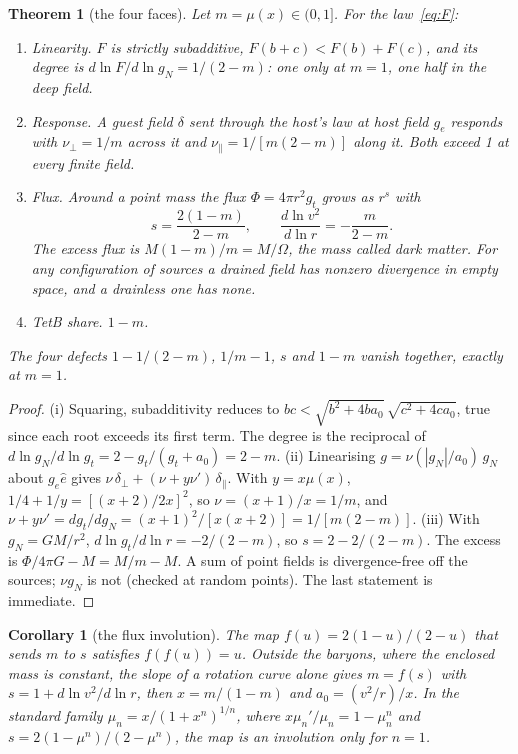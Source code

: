 \documentclass[twocolumn]{iopjournal}
\newtheorem{theorem}{Theorem}
\newtheorem{corollary}{Corollary}
\theoremstyle{definition}
\theoremstyle{remark}
\begin{document}
\begin{theorem}[the four faces]\label{thm:faces}
Let $m = \mu(x) \in (0,1]$. For the law~\eqref{eq:F}:
\begin{enumerate}
\item[(i)] \emph{Linearity.} $F$ is strictly subadditive,
  $F(b + c) < F(b) + F(c)$, and its degree is
  $d\ln F/d\ln g_N = 1/(2 - m)$: one only at $m = 1$, one half in the deep
  field.
\item[(ii)] \emph{Response.} A guest field $\delta$ sent through the
  host's law at host field $g_e$ responds with $\nu_\perp = 1/m$
  across it and $\nu_\parallel = 1/[m(2-m)]$ along it. Both exceed 1 at
  every finite field.
\item[(iii)] \emph{Flux.} Around a point mass the flux
  $\Phi = 4\pi r^2 g_t$ grows as $r^s$ with
  \begin{equation}
    s = \frac{2(1-m)}{2-m}, \qquad
    \frac{d\ln v^2}{d\ln r} = -\frac{m}{2-m}. \label{eq:s}
  \end{equation}
  The excess flux is $M(1-m)/m = M/\Omega$, the mass called dark matter.
  For any configuration of sources a drained field has nonzero divergence
  in empty space, and a drainless one has none.
\item[(iv)] \emph{TetB share.} $1 - m$.
\end{enumerate}
The four defects $1 - 1/(2-m)$, $1/m - 1$, $s$ and $1 - m$ vanish
together, exactly at $m = 1$.
\end{theorem}

\begin{proof}
(i) Squaring, subadditivity reduces to $bc < \sqrt{b^2+4ba_0}\,
\sqrt{c^2+4ca_0}$, true since each root exceeds its first term. The
degree is the reciprocal of $d\ln g_N/d\ln g_t = 2 - g_t/(g_t + a_0) =
2 - m$. (ii) Linearising $g = \nu(|g_N|/a_0)\,g_N$ about $g_e\hat e$
gives $\nu\,\delta_\perp + (\nu + y\nu')\,\delta_\parallel$. With
$y = x\mu(x)$, $1/4 + 1/y = [(x+2)/2x]^2$, so $\nu = (x+1)/x = 1/m$, and
$\nu + y\nu' = dg_t/dg_N = (x+1)^2/[x(x+2)] = 1/[m(2-m)]$. (iii) With
$g_N = GM/r^2$, $d\ln g_t/d\ln r = -2/(2-m)$, so $s = 2 - 2/(2-m)$. The
excess is $\Phi/4\pi G - M = M/m - M$. A sum of point fields is
divergence-free off the sources; $\nu g_N$ is not (checked at random
points). The last statement is immediate.
\end{proof}

\begin{corollary}[the flux involution]\label{cor:inv}
The map $f(u) = 2(1-u)/(2-u)$ that sends $m$ to $s$ satisfies
$f(f(u)) = u$. Outside the baryons, where the enclosed mass is constant,
the slope of a rotation curve alone gives $m = f(s)$ with
$s = 1 + d\ln v^2/d\ln r$, then $x = m/(1-m)$ and $a_0 = (v^2/r)/x$. In
the standard family $\mu_n = x/(1+x^n)^{1/n}$, where
$x\mu_n'/\mu_n = 1 - \mu_n^n$ and $s = 2(1-\mu^n)/(2-\mu^n)$, the map is
an involution only for $n = 1$.
\end{corollary}
\end{document}

